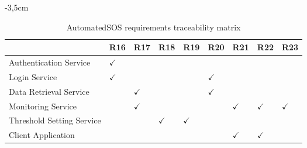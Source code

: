 \begin{table}
\begin{adjustwidth}{-3,5cm}{}
\captionsetup{justification=centering}
\caption{AutomatedSOS requirements traceability matrix}
  \label{tab:table2}
\begin{tabular}{|l||l|l|l|l|l|l|l|l|}
\hline
\cellcolor[HTML]{EFEFEF}                      & \cellcolor[HTML]{EFEFEF}R16 & \cellcolor[HTML]{EFEFEF}R17 & \cellcolor[HTML]{EFEFEF}R18 & \cellcolor[HTML]{EFEFEF}R19 & \cellcolor[HTML]{EFEFEF}R20 & \cellcolor[HTML]{EFEFEF}R21 & \cellcolor[HTML]{EFEFEF}R22 & \cellcolor[HTML]{EFEFEF}R23 \\ \hline \hline
\cellcolor[HTML]{EFEFEF}Authentication Service & $\checkmark$  &    &    &   &   &   &    &    \\ \hline
\cellcolor[HTML]{EFEFEF}Login Service     &  $\checkmark$  &       &   &    & $\checkmark$   &    &    &    \\ \hline
\cellcolor[HTML]{EFEFEF}Data Retrieval Service         &    & $\checkmark$     &    &   &  $\checkmark$  &    &    &   \\ \hline
\cellcolor[HTML]{EFEFEF}Monitoring Service    &    &   $\checkmark$ &      &    &    &  $\checkmark$  & $\checkmark$  &  $\checkmark$  \\ \hline
\cellcolor[HTML]{EFEFEF}Threshold Setting Service  &    &       &  $\checkmark$  &  $\checkmark$  &    &    &    &    \\ \hline
\cellcolor[HTML]{EFEFEF}Client Application  &    &    &       &    &    &  $\checkmark$  &  $\checkmark$  &     \\ \hline
\end{tabular}
\end{adjustwidth}
\end{table}

